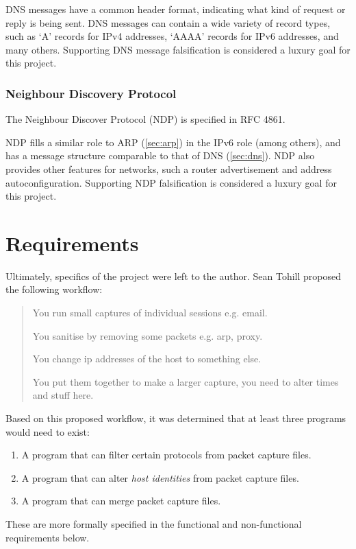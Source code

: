 \documentclass[10pt,a4paper,notitlepage]{report}
\begin{document}
DNS messages have a common header format, indicating what kind of request or reply is being sent. DNS messages can contain a wide variety of record types, such as `A' records for IPv4 addresses, `AAAA' records for IPv6 addresses, and many others. Supporting DNS message falsification is considered a luxury goal for this project.

\subsection{Neighbour Discovery Protocol}
\label{sec:ndp}
The Neighbour Discover Protocol (NDP) is specified in RFC 4861\cite{rfc4861}.

NDP fills a similar role to ARP (\ref{sec:arp}) in the IPv6 role (among others), and has a message structure comparable to that of DNS (\ref{sec:dns}). NDP also provides other features for networks, such a router advertisement and address autoconfiguration. Supporting NDP falsification is considered a luxury goal for this project.

\chapter{Requirements}
Ultimately, specifics of the project were left to the author. Sean Tohill proposed the following workflow:

\begin{quote}
You run small captures of individual sessions e.g. email.

You sanitise by removing some packets e.g. arp, proxy.

You change ip addresses of the host to something else.

You put them together to make a larger capture, you need to alter times and stuff here.
\end{quote}

Based on this proposed workflow, it was determined that at least three programs would need to exist:
\begin{enumerate}[label=\roman*)]
\item A program that can filter certain protocols from packet capture files.
\item A program that can alter \emph{host identities} from packet capture files.
\item A program that can merge packet capture files.
\end{enumerate}
These are more formally specified in the functional and non-functional requirements below.
\end{document}

